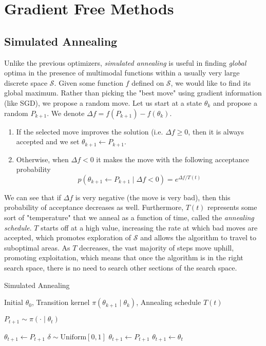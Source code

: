 \section{Gradient Free Methods}

\subsection{Simulated Annealing}

  Unlike the previous optimizers, \textit{simulated annealing} is useful in finding \textit{global} optima in the presence of multimodal functions within a usually very large discrete space $\mathcal{S}$. Given some function $f$ defined on $\mathcal{S}$, we would like to find its global maximum. Rather than picking the "best move" using gradient information (like SGD), we propose a random move. Let us start at a state $\theta_k$ and propose a random $P_{k+1}$. We denote $\Delta f = f(P_{k+1}) - f(\theta_k)$. 
  \begin{enumerate}
      \item If the selected move improves the solution (i.e. $\Delta f \geq 0$, then it is always accepted and we set $\theta_{k+1} \gets P_{k+1}$. 
      \item Otherwise, when $\Delta f < 0$ it makes the move with the following acceptance probability 
      \[p(\theta_{k+1} \gets P_{k+1} \mid \Delta f < 0) = e^{\Delta f / T(t)}\]
  \end{enumerate}
  We can see that if $\Delta f$ is very negative (the move is very bad), then this probability of acceptance decreases as well. Furthermore, $T(t)$ represents some sort of "temperature" that we anneal as a function of time, called the \textit{annealing schedule}. $T$ starts off at a high value, increasing the rate at which bad moves are accepted, which promotes exploration of $\mathcal{S}$ and allows the algorithm to travel to suboptimal areas. As $T$ decreases, the vast majority of steps move uphill, promoting exploitation, which means that once the algorithm is in the right search space, there is no need to search other sections of the search space. 

  \begin{algorithm}
  \caption{Simulated Annealing}\label{alg:sim_anneal}
  \begin{algorithmic}

  \Require Initial $\theta_0$, Transition kernel $\pi(\theta_{k+1} \mid \theta_k)$, Annealing schedule $T(t)$

      \State $P_{t+1} \sim \pi( \cdot \mid \theta_t)$
      
          \State $\theta_{t+1} \gets P_{t+1}$ 
      \Else 
          \State $\delta \sim \mathrm{Uniform}[0, 1]$
          \If{$\delta < \exp[(f(P_{t+1}) - f(\theta_t))/T(t)]$}
              \State $\theta_{t+1} \gets P_{t+1}$ 
          \Else 
              \State $\theta_{t+1} \gets \theta_t$ 
          \EndIf
      \EndIf
  \EndFor

  \end{algorithmic}
  \end{algorithm}

